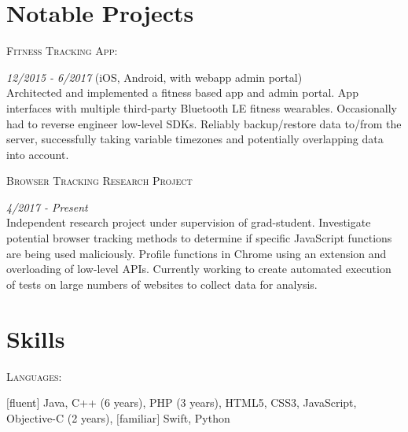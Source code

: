 \documentclass[letterpaper]{article} %
\begin{document}
\section{Notable Projects}
\vspace{0.5em}


\noindent\begin{large}\textsc{Fitness Tracking App:}\end{large} \textit{12/2015 - 6/2017} (iOS, Android, with webapp admin portal)\\
Architected and implemented a fitness based app and admin portal. App interfaces with multiple third-party Bluetooth LE fitness wearables. Occasionally had to reverse engineer low-level SDKs. Reliably backup/restore data to/from the server, successfully taking variable timezones and potentially overlapping data into account.






\noindent\begin{large}\textsc{Browser Tracking Research Project}\end{large} \textit{4/2017 - Present}\\
Independent research project under supervision of grad-student. Investigate potential browser tracking methods to determine if specific JavaScript functions are being used maliciously. Profile functions in Chrome using  an extension and overloading of low-level APIs. Currently working to create automated execution of tests on large numbers of websites to collect data for analysis.


\section{Skills}
\vspace{0.5em}
\noindent\begin{large}\textsc{Languages:}\end{large}
\([\)fluent\(]\) Java, C++ (6 years), PHP (3 years), HTML5, CSS3, JavaScript, Objective-C (2 years), \([\)familiar\(]\) Swift, Python
\end{document}
